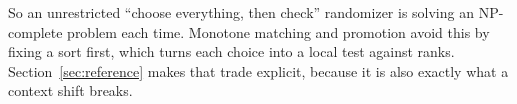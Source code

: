So an unrestricted ``choose everything, then check'' randomizer is solving an NP-complete problem each time. Monotone matching and promotion avoid this by fixing a sort first, which turns each choice into a local test against ranks. Section~\ref{sec:reference} makes that trade explicit, because it is also exactly what a context shift breaks.
